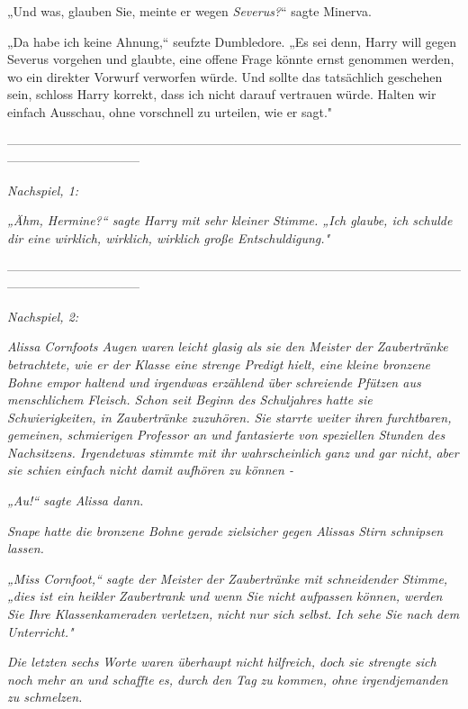 {„Und was, glauben Sie, meinte er wegen \emph{Severus?}“ sagte Minerva.

„Da habe ich keine Ahnung,“ seufzte Dumbledore. „Es sei denn, Harry will gegen Severus vorgehen und glaubte, eine offene Frage könnte ernst genommen werden, wo ein direkter Vorwurf verworfen würde. Und sollte das tatsächlich geschehen sein, schloss Harry korrekt, dass ich nicht darauf vertrauen würde. Halten wir einfach Ausschau, ohne vorschnell zu urteilen, wie er sagt."

--------------------------------------------------------------------------------------------------------------------------------------------

\hfill\break \emph{\emph{Nachspiel, 1:}}

\emph{„Ähm, Hermine?“ sagte Harry mit sehr kleiner Stimme. „Ich glaube, ich schulde dir eine wirklich, wirklich, wirklich große Entschuldigung."}

--------------------------------------------------------------------------------------------------------------------------------------------

\hfill\break \emph{\emph{Nachspiel, 2:}}

\emph{Alissa Cornfoots Augen waren leicht glasig als sie den Meister der Zaubertränke betrachtete, wie er der Klasse eine strenge Predigt hielt, eine kleine bronzene Bohne empor haltend und irgendwas erzählend über schreiende Pfützen aus menschlichem Fleisch. Schon seit Beginn des Schuljahres hatte sie Schwierigkeiten, in Zaubertränke zuzuhören. Sie starrte weiter ihren furchtbaren, gemeinen, schmierigen Professor an und fantasierte von speziellen Stunden des Nachsitzens. Irgendetwas stimmte mit ihr wahrscheinlich} \emph{\emph{ganz und gar nicht,}} \emph{aber sie schien einfach nicht damit aufhören zu können -}

\emph{„Au!“ sagte Alissa dann.}

\emph{Snape hatte die bronzene Bohne gerade zielsicher gegen Alissas Stirn} \emph{schnipsen lassen.}

\emph{„Miss Cornfoot,“ sagte der Meister der Zaubertränke mit schneidender Stimme, „dies ist ein heikler Zaubertrank und wenn Sie nicht aufpassen können, werden Sie Ihre Klassenkameraden verletzen, nicht nur sich selbst.} \emph{Ich sehe Sie nach dem Unterricht."}

\emph{Die letzten sechs} \emph{Worte waren überhaupt nicht hilfreich, doch sie strengte sich noch mehr an und schaffte es, durch den Tag zu kommen, ohne irgendjemanden} \emph{zu schmelzen.}

}
